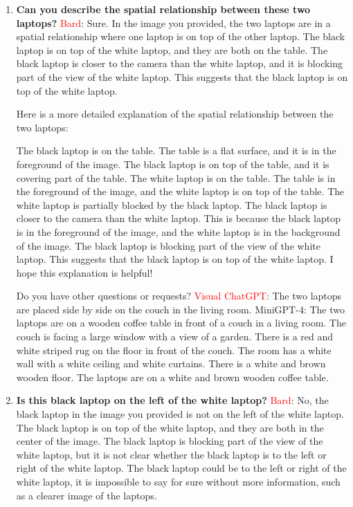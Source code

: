\begin{enumerate}
    \item \textbf{Can you describe the spatial relationship between these two laptops?}
    \subitem \textcolor{Red}{Bard}: Sure. In the image you provided, the two laptops are in a spatial relationship where one laptop is on top of the other laptop. The black laptop is on top of the white laptop, and they are both on the table. The black laptop is closer to the camera than the white laptop, and it is blocking part of the view of the white laptop. This suggests that the black laptop is on top of the white laptop.

    Here is a more detailed explanation of the spatial relationship between the two laptops:
    
    The black laptop is on the table. The table is a flat surface, and it is in the foreground of the image. The black laptop is on top of the table, and it is covering part of the table.
    The white laptop is on the table. The table is in the foreground of the image, and the white laptop is on top of the table. The white laptop is partially blocked by the black laptop.
    The black laptop is closer to the camera than the white laptop. This is because the black laptop is in the foreground of the image, and the white laptop is in the background of the image.
    The black laptop is blocking part of the view of the white laptop. This suggests that the black laptop is on top of the white laptop.
    I hope this explanation is helpful!
    
    Do you have other questions or requests?
    \subitem \textcolor{red}{Visual ChatGPT}: The two laptops are placed side by side on the couch in the living room.
    \subitem MiniGPT-4: The two laptops are on a wooden coffee table in front of a couch in a living room. The couch is facing a large window with a view of a garden. There is a red and white striped rug on the floor in front of the couch. The room has a white wall with a white ceiling and white curtains. There is a white and brown wooden floor. The laptops are on a white and brown wooden coffee table.
    \item \textbf{Is this black laptop on the left of the white laptop?}
    \subitem \textcolor{Red}{Bard}: No, the black laptop in the image you provided is not on the left of the white laptop. The black laptop is on top of the white laptop, and they are both in the center of the image. The black laptop is blocking part of the view of the white laptop, but it is not clear whether the black laptop is to the left or right of the white laptop. The black laptop could be to the left or right of the white laptop, it is impossible to say for sure without more information, such as a clearer image of the laptops.


\end{enumerate}
